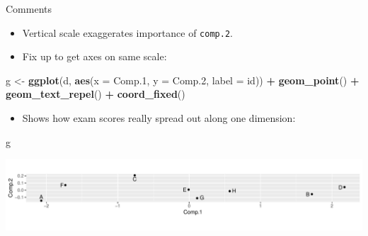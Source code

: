 \documentclass[
  ignorenonframetext,
]{beamer}
\newenvironment{Shaded}{\begin{snugshade}}{\end{snugshade}}
\newcommand{\DataTypeTok}[1]{\textcolor[rgb]{0.13,0.29,0.53}{#1}}
\newcommand{\FloatTok}[1]{\textcolor[rgb]{0.00,0.00,0.81}{#1}}
\newcommand{\KeywordTok}[1]{\textcolor[rgb]{0.13,0.29,0.53}{\textbf{#1}}}
\newcommand{\NormalTok}[1]{#1}
\newcommand{\OperatorTok}[1]{\textcolor[rgb]{0.81,0.36,0.00}{\textbf{#1}}}
\newcommand{\StringTok}[1]{\textcolor[rgb]{0.31,0.60,0.02}{#1}}
\providecommand{\tightlist}{%
  \setlength{\itemsep}{0pt}\setlength{\parskip}{0pt}}
\begin{document}
\begin{frame}[fragile]{Comments}
\protect\hypertarget{comments-30}{}

\begin{itemize}
\item
  Vertical scale exaggerates importance of \texttt{comp.2}.
\item
  Fix up to get axes on same scale:
\end{itemize}

\begin{Shaded}
\begin{Highlighting}[]
\NormalTok{g <-}\StringTok{ }\KeywordTok{ggplot}\NormalTok{(d, }\KeywordTok{aes}\NormalTok{(}\DataTypeTok{x =}\NormalTok{ Comp}\FloatTok{.1}\NormalTok{, }\DataTypeTok{y =}\NormalTok{ Comp}\FloatTok{.2}\NormalTok{, }\DataTypeTok{label =}\NormalTok{ id)) }\OperatorTok{+}
\StringTok{  }\KeywordTok{geom_point}\NormalTok{() }\OperatorTok{+}\StringTok{ }\KeywordTok{geom_text_repel}\NormalTok{() }\OperatorTok{+}
\StringTok{  }\KeywordTok{coord_fixed}\NormalTok{()}
\end{Highlighting}
\end{Shaded}

\begin{itemize}
\tightlist
\item
  Shows how exam scores really spread out along one dimension:
\end{itemize}

\begin{Shaded}
\begin{Highlighting}[]
\NormalTok{g}
\end{Highlighting}
\end{Shaded}

\includegraphics{slides_d29_files/figure-beamer/eqsc2-1.pdf}

\end{frame}
\end{document}
